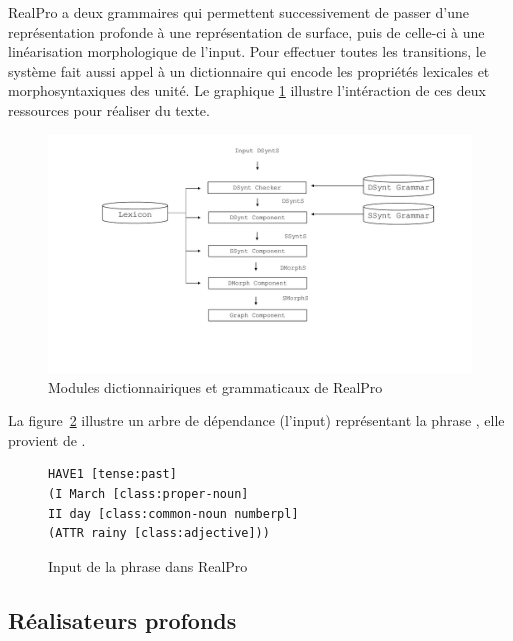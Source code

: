 RealPro a deux grammaires qui permettent successivement de passer d'une représentation profonde à une représentation de surface, puis de celle-ci à une linéarisation morphologique de l'input. Pour effectuer toutes les transitions, le système fait aussi appel à un dictionnaire qui encode les propriétés lexicales et morphosyntaxiques des unité. Le graphique \ref{fig:RealPro} illustre l'intéraction de ces deux ressources pour réaliser du texte.

\begin{figure}[htb]
	\centering
	\includegraphics[width=1\textwidth, trim = {0cm 0cm 0cm 0cm},clip]{ch2/figs/realpro.pdf}
	\caption{Modules dictionnairiques et grammaticaux de RealPro}
	\label{fig:RealPro}
\end{figure}

La figure~\ref{lst:realpro} illustre un arbre de dépendance (l'input) représentant la phrase , elle provient de \cite{ReiterBuildingNaturalLanguage2000}.

\begin{figure}[htb]
\caption{Input de la phrase  dans RealPro}
\label{lst:realpro}
\begin{lstlisting}[language=mate]
HAVE1 [tense:past]
(I March [class:proper-noun]
II day [class:common-noun numberpl]
(ATTR rainy [class:adjective]))
\end{lstlisting}
\end{figure}


\subsection{Réalisateurs profonds}

